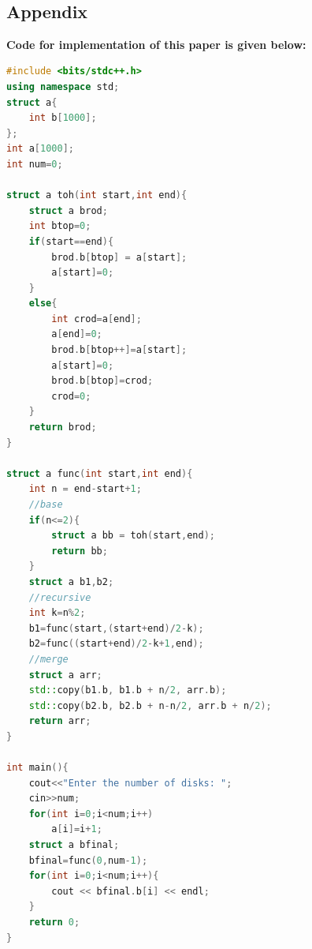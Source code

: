 \documentclass[conference]{IEEEtran}
\begin{document}
\color{black}
\
\begin{titlepage}
    \begin{center}
        \Huge
        \section*{Appendix}
        \end{center}
         \textbf{Code for implementation of this paper is given below:}
\begin{lstlisting}[language=C++,caption=Code for this paper]
#include <bits/stdc++.h>
using namespace std;
struct a{
    int b[1000];
};
int a[1000];
int num=0;

struct a toh(int start,int end){
    struct a brod;
    int btop=0;
    if(start==end){
        brod.b[btop] = a[start];
        a[start]=0;
    }
    else{
        int crod=a[end];
        a[end]=0;
        brod.b[btop++]=a[start];
        a[start]=0;
        brod.b[btop]=crod;
        crod=0;
    }
    return brod;
}

struct a func(int start,int end){
    int n = end-start+1;
    //base
    if(n<=2){
        struct a bb = toh(start,end);
        return bb;
    }
    struct a b1,b2;
    //recursive
    int k=n%2;
    b1=func(start,(start+end)/2-k);
    b2=func((start+end)/2-k+1,end);
    //merge
    struct a arr;
    std::copy(b1.b, b1.b + n/2, arr.b);
    std::copy(b2.b, b2.b + n-n/2, arr.b + n/2);
    return arr;
}

int main(){
    cout<<"Enter the number of disks: ";
    cin>>num;
    for(int i=0;i<num;i++)
        a[i]=i+1;
    struct a bfinal;
    bfinal=func(0,num-1);
    for(int i=0;i<num;i++){
        cout << bfinal.b[i] << endl;
    }
    return 0;
}
   
\end{lstlisting}
\end{titlepage}
\end{document}
